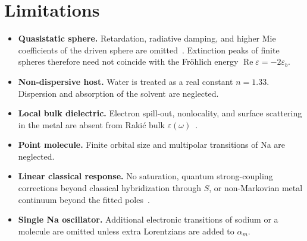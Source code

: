 \documentclass[11pt,a4paper]{article}
\begin{document}
\section{Limitations}
\label{sec:limits}

\begin{itemize}[leftmargin=1.4em]
  \item \textbf{Quasistatic sphere.}
        Retardation, radiative damping, and higher Mie coefficients of the
        driven sphere are omitted~\citep{bohren1983,maier2007}.  Extinction peaks of finite spheres therefore
        need not coincide with the Fr\"{o}hlich energy
        $\operatorname{Re}\varepsilon=-2\varepsilon_b$.
  \item \textbf{Non-dispersive host.}
        Water is treated as a real constant $n=1.33$.  Dispersion and absorption
        of the solvent are neglected.
  \item \textbf{Local bulk dielectric.}
        Electron spill-out, nonlocality, and surface scattering in the metal are
        absent from Raki\'{c} bulk $\varepsilon(\omega)$~\citep{rakic1998,ciraci2012}.
  \item \textbf{Point molecule.}
        Finite orbital size and multipolar transitions of Na are neglected.
  \item \textbf{Linear classical response.}
        No saturation, quantum strong-coupling corrections beyond classical
        hybridization through $S$, or non-Markovian metal continuum beyond the
        fitted poles~\citep{torma2015}.
  \item \textbf{Single Na oscillator.}
        Additional electronic transitions of sodium or a molecule are omitted
        unless extra Lorentzians are added to $\alpha_m$.
\end{itemize}
\end{document}
